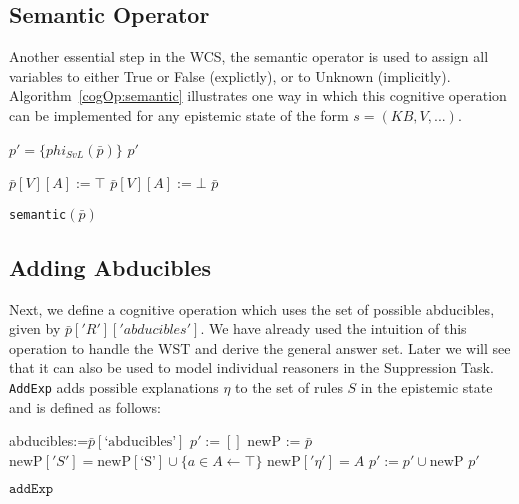\subsection{Semantic Operator}

Another essential step in the WCS, the semantic operator is used to assign all variables to either True or False (explictly), or to Unknown (implicitly). Algorithm~\ref{cogOp:semantic} illustrates one way in which this cognitive operation can be implemented for any epistemic state of the form $s=(KB,V,...)$.

\begin{algorithm}[H] \label{cogOp:semantic}
\SetAlgoLined
{}
{
$p'= \{phi_{SvL}(\bar{p})\}$\;
\Return $p'$
}

{
{
{
$\bar{p}[V][A]:=\top$
}
}
{
{
$\bar{p}[V][A]:=\bot$
}
}
\Return $\bar{p}$
}

\caption{\texttt{semantic}$(\bar{p})$}
\end{algorithm}

\subsection{Adding Abducibles} \label{ssec:abd}
Next, we define a cognitive operation which uses the set of possible abducibles, given by $\bar{p}['R']['abducibles']$. We have already used the intuition of this operation to handle the WST and derive the general answer set. Later we will see that it can also be used to model individual reasoners in the Suppression Task. \texttt{AddExp} adds possible explanations $\eta$ to the set of rules $S$ in the epistemic state and is defined as follows:

\begin{algorithm}[H] \label{cogOp:addExp}
\SetAlgoLined
{}
{
abducibles:=$\bar{p}[\text{`abducibles'}]$\;
$p':=[]$\;
{
newP := $\bar{p}$\;
$\text{newP}['S']=\text{newP}[\text{`S'}] \cup \{a \in A\leftarrow \top\}$\;
$\text{newP}['\eta']=A$\;
$p':=p' \cup \text{newP}$\;
}
\Return $p'$
}

\caption{$\texttt{addExp}$}
\end{algorithm}


